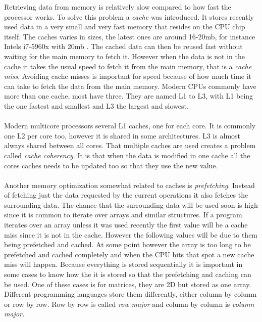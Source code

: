 \documentclass[10pt,a4paper]{report}
\begin{document}
Retrieving data from memory is relatively slow compared to how fast the processor works\cite{introduction_hpc_hager,drepper2007cpumemory}. %
To solve this problem a \emph{cache} was introduced\cite{drepper2007cpumemory}. It stores recently used data in a very small and very fast memory that resides on the CPU chip itself\cite{drepper2007cpumemory}. The caches varies in sizes, the latest ones are around 16-20mb, for instance Intels i7-5960x with 20mb \cite{intel_haswell_2014_5960x}. The cached data can then be reused fast without waiting for the main memory to fetch it. However when the data is not in the cache it takes the usual speed to fetch it from the main memory, that is a \emph{cache miss}\cite{drepper2007cpumemory}. Avoiding cache misses is important for speed because of how much time it can take to fetch the data from the main memory\cite{drepper2007cpumemory}. Modern CPUs commonly have more than one cache, most have three\cite{introduction_hpc_hager}. They are named L1 to L3, with L1 being the one fastest and smallest and L3 the largest and slowest\cite{introduction_hpc_hager}.\\
\\
Modern multicore processors several L1 caches, one for each core\cite{introduction_hpc_hager}. It is commonly one L2 per core too, however it is shared in some architectures\cite{introduction_hpc_hager}. L3 is almost always shared between all cores\cite{introduction_hpc_hager}. That multiple caches are used creates a problem called \emph{cache coherency}. It is that when the data is modified in one cache all the cores caches needs to be updated too so that they use the new value\cite{introduction_hpc_hager}.\\
\\
Another memory optimization somewhat related to caches is \emph{prefetching}\cite{introduction_hpc_hager, drepper2007cpumemory}. Instead of fetching just the data requested by the current operations it also fetches the surrounding data\cite{drepper2007cpumemory}. The chance that the surrounding data will be used soon is high since it is common to iterate over arrays and similar structures\cite{introduction_hpc_hager}. If a program iterates over an array unless it was used recently the first value will be a cache miss since it is not in the cache. However the following values will be due to them being prefetched and cached. At some point however the array is too long to be prefetched and cached completely and when the CPU hits that spot a new cache miss will happen\cite{drepper2007cpumemory}. Because everything is stored sequentially it is important in some cases to know how the it is stored so that the prefetching and caching can be used. One of these cases is for matrices, they are 2D but stored as one array. Different programming languages store them differently, either column by column or row by row. Row by row is called \emph{row major} and column by column is \emph{column major.}\\ %
\end{document}
